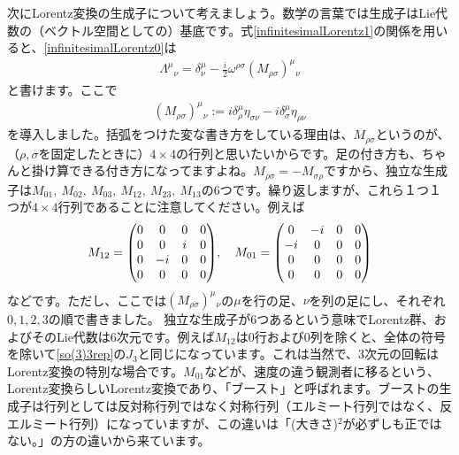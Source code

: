 \documentclass[report,paper=a4, fontsize=12pt, line_length=16cm, number_of_lines=33,dvipdfmx]{jlreq}
\numberwithin{equation}{chapter}
\begin{document}
次にLorentz変換の生成子について考えましょう。数学の言葉では生成子はLie代数の（ベクトル空間としての）基底です。式\eqref{infinitesimalLorentz1}の関係を用いると、\eqref{infinitesimalLorentz0}は
\begin{align}
  \Lambda^{\mu}{}_{\nu}=\delta^{\mu}_{\nu}-\frac{i}{2}\omega^{\rho\sigma}(M_{\rho\sigma})^{\mu}{}_{\nu}
\end{align}
と書けます。ここで
\begin{align}
  (M_{\rho\sigma})^{\mu}{}_{\nu}:=i\delta^{\mu}_{\rho}\eta_{\sigma\nu}-i\delta^{\mu}_{\sigma}\eta_{\rho\nu}\label{vectorrep0}
\end{align}
を導入しました。括弧をつけた変な書き方をしている理由は、$M_{\rho\sigma}$というのが、（$\rho,\sigma$を固定したときに）$4\times 4$の行列と思いたいからです。足の付き方も、ちゃんと掛け算できる付き方になってますよね。$M_{\rho\sigma}=-M_{\sigma\rho}$ですから、独立な生成子は$M_{01},\ M_{02},\ M_{03},\ M_{12},\ M_{23},\ M_{13}$の6つです。繰り返しますが、これら１つ１つが$4\times 4$行列であることに注意してください。例えば
\begin{align}
  M_{12}=\mqty(
    0 & 0 & 0 & 0 \\  
    0 & 0 & i & 0 \\  
    0 &-i & 0 & 0 \\  
    0 & 0 & 0 & 0 \\  
  ),\quad
  M_{01}=\mqty(
    0 & -i& 0 & 0 \\  
    -i& 0 & 0 & 0 \\  
    0 & 0 & 0 & 0 \\  
    0 & 0 & 0 & 0 \\  
  )
\end{align}
などです。ただし、ここでは$(M_{\rho\sigma})^{\mu}{}_{\nu}$の$\mu$を行の足、$\nu$を列の足にし、それぞれ$0,1,2,3$の順で書きました。
独立な生成子が6つあるという意味でLorentz群、およびそのLie代数は6次元です。例えば$M_{12}$は$0$行および$0$列を除くと、全体の符号を除いて\eqref{so(3)3rep}の$J_3$と同じになっています。これは当然で、3次元の回転はLorentz変換の特別な場合です。$M_{01}$などが、速度の違う観測者に移るという、Lorentz変換らしいLorentz変換であり、「ブースト」と呼ばれます。ブーストの生成子は行列としては反対称行列ではなく対称行列（エルミート行列ではなく、反エルミート行列）になっていますが、この違いは「(大きさ)${}^2$が必ずしも正ではない。」の方の違いから来ています。
\end{document}

